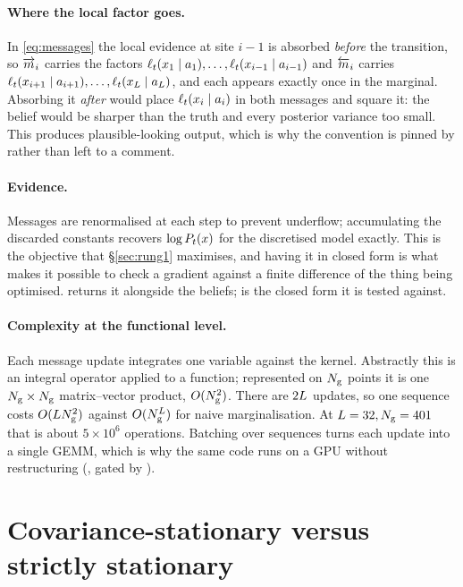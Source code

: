 \paragraph{Where the local factor goes.} In \eqref{eq:messages} the local evidence at site $i-1$
is absorbed \emph{before} the transition, so $\overrightarrow{m}_i$ carries the factors
$\ell_t(x_1\mid a_1),\dots,\ell_t(x_{i-1}\mid a_{i-1})$ and $\overleftarrow{m}_i$ carries
$\ell_t(x_{i+1}\mid a_{i+1}),\dots,\ell_t(x_{L}\mid a_{L})$, and each appears exactly
once in the marginal. Absorbing it \emph{after} would place $\ell_t(x_i\mid a_i)$ in both
messages and square it: the
belief would be sharper than the truth and every posterior variance too small. This produces
plausible-looking output, which is why the convention is pinned by
 rather than left to a comment.

\paragraph{Evidence.} Messages are renormalised at each step to prevent underflow; accumulating
the discarded constants recovers $\log P_t(x)$ for the discretised model exactly. This is the
objective that \S\ref{sec:rung1} maximises, and having it in closed form is what makes it possible
to check a gradient against a finite difference of the thing being optimised.
 returns it alongside the beliefs;
 is the closed form it is tested against.

\paragraph{Complexity at the functional level.} Each message update integrates one variable
against the kernel. Abstractly this is an integral operator applied to a function; represented on
$N_{\mathrm{g}}$ points it is one $N_{\mathrm{g}}\times N_{\mathrm{g}}$ matrix--vector product, $O(N_{\mathrm{g}}^2)$. There are
$2L$ updates, so one sequence costs $O(LN_{\mathrm{g}}^2)$ against $O(N_{\mathrm{g}}^{L})$ for
naive marginalisation. At $L=32,N_{\mathrm{g}}=401$ that is about $5\times10^6$ operations.
Batching over sequences turns each update into a single GEMM, which is why the same code runs on
a GPU without restructuring (, gated by
).

\section{Covariance-stationary versus strictly stationary}
\label{app:stationary}

